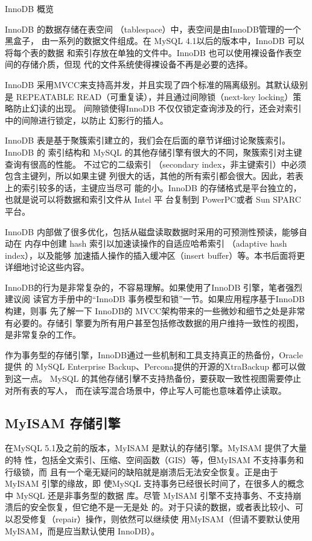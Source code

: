 InnoDB 概览

InnoDB 的数据存储在表空间 （tablespace）中，表空间是由InnoDB管理的一个黑盒子，
由一系列的数据文件组成。在 MySQL 4.1以后的版本中，InnoDB 可以将每个表的数据
和索引存放在单独的文件中。InnoDB 也可以使用裸设备作表空间的存储介质，但现
代的文件系统使得裸设备不再是必要的选择。

InnoDB 采用MVCC来支持高并发，并且实现了四个标准的隔离级别。其默认级别是
REPEATABLE READ（可重复读），并且通过间隙锁（next-key locking）策略防止幻读的出现。
间隙锁使得InnoDB 不仅仅锁定查询涉及的行，还会对索引中的间隙进行锁定，以防止
幻影行的插人。

InnoDB 表是基于聚簇索引建立的，我们会在后面的章节详细讨论聚簇索引。InnoDB 的
索引结构和 MySQL 的其他存储引擎有很大的不同，聚簇索引对主键查询有很高的性能。
不过它的二级索引 （secondary index，非主键索引）中必须包含主键列，所以如果主键
列很大的话，其他的所有索引都会很大。因此，若表上的索引较多的话，主键应当尽可
能的小。InnoDB 的存储格式是平台独立的，也就是说可以将数据和索引文件从 Intel 平
台复制到 PowerPC或者 Sun SPARC平台。

InnoDB 内部做了很多优化，包括从磁盘读取数据时采用的可预测性预读，能够自动在
内存中创建 hash 索引以加速读操作的自适应哈希索引 （adaptive hash index），以及能够
加速插人操作的插入缓冲区（insert buffer）等。本书后面将更详细地讨论这些内容。

InnoDB的行为是非常复杂的，不容易理解。如果使用了InnoDB 引擎，笔者强烈建议阅
读官方手册中的“InnoDB 事务模型和锁”一节。如果应用程序基于InnoDB构建，则事
先了解一下 InnoDB的 MVCC架构带来的一些微妙和细节之处是非常有必要的。存储引
擎要为所有用户甚至包括修改数据的用户维持一致性的视图，是非常复杂的工作。

作为事务型的存储引擎，InnoDB通过一些机制和工具支持真正的热备份，Oracle 提供
的 MySQL Enterprise Backup、Percona提供的开源的XtraBackup 都可以做到这一点。
MySQL 的其他存储引擊不支持热备份，要获取一致性视图需要停止对所有表的写人，
而在读写混合场景中，停止写人可能也意味着停止读取。

\subsection{MyISAM 存储引擎}
在MySQL 5.1及之前的版本，MyISAM 是默认的存储引擎。MyISAM 提供了大量的特
性，包括全文索引、压缩、空间函数（GIS）等，但MyISAM 不支持事务和行级锁，而
且有一个毫无疑问的缺陷就是崩溃后无法安全恢复。正是由于 MyISAM 引擎的缘故，即
使MySQL 支持事务已经很长时间了，在很多人的概念中 MySQL 还是非事务型的数据
库。尽管 MyISAM 引擎不支持事务、不支持崩溃后的安全恢复，但它绝不是一无是处
的。对于只读的数据，或者表比较小、可以忍受修复（repair）操作，则依然可以继续使
用MyISAM（但请不要默认使用MyISAM，而是应当默认使用 InnoDB）。

